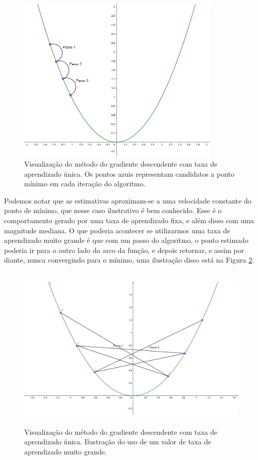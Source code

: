 \begin{figure}[htb]
\centering
\includegraphics[height=8cm]{figuras/grad_1}
\caption{Visualização do método do gradiente descendente com taxa de aprendizado única. Os pontos azuis representam candidatos a ponto mínimo em cada iteração do algoritmo.}
\label{fig:grad_1}
\end{figure}

Podemos notar que as estimativas aproximam-se a uma velocidade constante do ponto de mínimo, que nesse caso ilustrativo é bem conhecido. Esse é o comportamento gerado por uma taxa de aprendizado fixa, e além disso com uma magnitude mediana. O que poderia acontecer se utilizarmos uma taxa de aprendizado muito grande é que com um passo do algoritmo, o ponto estimado poderia ir para o outro lado do arco da função, e depois retornar, e assim por diante, nunca convergindo para o mínimo, uma ilustração disso está na Figura \ref{fig:grad_2}.

\begin{figure}[htb]
\centering
\includegraphics[height=8cm]{figuras/grad_2}
\caption{Visualização do método do gradiente descendente com taxa de aprendizado única. Ilustração do uso de um valor de taxa de aprendizado muito grande.}
\label{fig:grad_2}
\end{figure}

